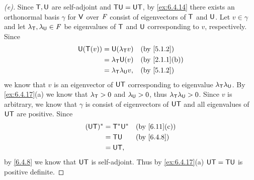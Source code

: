 \begin{proof}[(e)]
  Since \(\mathsf{T}, \mathsf{U}\) are self-adjoint and \(\mathsf{T} \mathsf{U} = \mathsf{U} \mathsf{T}\), by \cref{ex:6.4.14} there exists an orthonormal basis \(\gamma\) for \(\mathsf{V}\) over \(\mathit{F}\) consist of eigenvectors of \(\mathsf{T}\) and \(\mathsf{U}\).
  Let \(v \in \gamma\) and let \(\lambda_{\mathsf{T}}, \lambda_{\mathsf{U}} \in \mathit{F}\) be eigenvalues of \(\mathsf{T}\) and \(\mathsf{U}\) corresponding to \(v\), respectively.
  Since
  \begin{align*}
    \U(\T(v)) & = \U(\lambda_{\T} v)           &  & \by{5.1.2}    \\
              & = \lambda_{\T} \U(v)           &  & \by{2.1.1}[b] \\
              & = \lambda_{\T} \lambda_{\U} v, &  & \by{5.1.2}
  \end{align*}
  we know that \(v\) is an eigenvector of \(\mathsf{U} \mathsf{T}\) corresponding to eigenvalue \(\lambda_{\mathsf{T}} \lambda_{\mathsf{U}}\).
  By \cref{ex:6.4.17}(a) we know that \(\lambda_{\mathsf{T}} > 0\) and \(\lambda_{\mathsf{U}} > 0\), thus \(\lambda_{\mathsf{T}} \lambda_{\mathsf{U}} > 0\).
  Since \(v\) is arbitrary, we know that \(\gamma\) is consist of eigenvectors of \(\mathsf{U} \mathsf{T}\) and all eigenvalues of \(\mathsf{U} \mathsf{T}\) are positive.
  Since
  \begin{align*}
    (\U \T)^* & = \T^* \U^* &  & \by{6.11}[c] \\
              & = \T \U     &  & \by{6.4.8}   \\
              & = \U \T,
  \end{align*}
  by \cref{6.4.8} we know that \(\mathsf{U} \mathsf{T}\) is self-adjoint.
  Thus by \cref{ex:6.4.17}(a) \(\mathsf{U} \mathsf{T} = \mathsf{T} \mathsf{U}\) is positive definite.
\end{proof}

